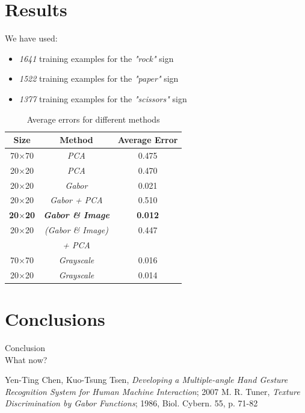 \documentclass[a4paper, 11pt, twocolumn]{article}
\begin{document}
    \section{Results}
	\label{sec:results}
		We have used:
		\begin{itemize}
		\item \emph{1641} training examples for the \emph{"rock"} sign 
		\item \emph{1522} training examples for the \emph{"paper"} sign
		\item \emph{1377} training examples for the \emph{"scissors"} sign
		\end{itemize}
		\begin{table}[!hbtp]
		\begin{tabular}{| c | c | c |}
			\hline\hline
			\textbf{Size} & \textbf{Method} & \textbf{Average Error}\\ 
			\hline\hline
			  70$\times$70 & \emph{PCA} & 0.475\\
			\hline
			  20$\times$20 & \emph{PCA} & 0.470\\
			\hline
			  20$\times$20 & \emph{Gabor} & 0.021\\
			\hline
			  20$\times$20 & \emph{Gabor + PCA} & 0.510\\
			\hline
			  \textbf{20$\times$20} & \textbf{\emph{Gabor \& Image}} & \textbf{0.012}\\
		 	\hline
			  20$\times$20 & \emph{(Gabor \& Image)} & 0.447\\
		               & \emph {+ PCA}  &     \\ 			
			\hline
			  70$\times$70 & \emph{Grayscale} & 0.016\\
			\hline
			  20$\times$20 & \emph{Grayscale} & 0.014\\
			\hline
		\end{tabular}
		\caption{Average errors for different methods}
		\end{table}

    \section{Conclusions}
	\label{sec:conclusion}
    	Conclusion\\
   	 	What now?
	\begin{thebibliography}{2}
		Yen-Ting Chen, Kuo-Tsung Tsen, \emph{Developing a Multiple-angle Hand Gesture Recognition System for Human Machine Interaction}; 2007
		M. R. Tuner, \emph{Texture Discrimination by Gabor Functions}; 1986, Biol. Cybern. 55, p. 71-82 
	\end{thebibliography}    
\end{document}
